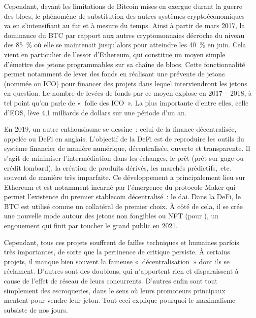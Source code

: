 
Cependant, devant les limitations de Bitcoin mises en exergue durant la guerre des blocs, le phénomène de substitution des autres systèmes cryptoéconomiques va en s'intensifiant au fur et à mesure du temps. Ainsi à partir de mars 2017, la dominance du BTC par rapport aux autres cryptomonnaies décroche du niveau des 85~\% où elle se maintenait jusqu'alors pour atteindre les 40~\% en juin. Cela vient en particulier de l'essor d'Ethereum, qui constitue un moyen simple d'émettre des jetons programmables sur sa chaîne de blocs. Cette fonctionnalité permet notamment de lever des fonds en réalisant une prévente de jetons (nommée  ou ICO) pour financer des projets dans lequel interviendront les jetons en question. Le nombre de levées de fonds par ce moyen explose en 2017 -- 2018, à tel point qu'on parle de «~folie des ICO~». La plus importante d'entre elles, celle d'EOS, lève 4,1 milliards de dollars sur une période d'un an.


En 2019, un autre enthousiasme se dessine~: celui de la finance décentralisée, appelée  ou DeFi en anglais. L'objectif de la DeFi est de reproduire les outils du système financier de manière numérique, décentralisée, ouverte et transparente. Il s'agit de minimiser l'intermédiation dans les échanges, le prêt (prêt sur gage ou crédit lombard), la création de produits dérivés, les marchés prédictifs,~etc. souvent de manière très imparfaite. Ce développement a principalement lieu sur Ethereum et est notamment incarné par l'émergence du protocole Maker qui permet l'existence du premier stablecoin décentralisé~: le dai. Dans la DeFi, le BTC est utilisé comme un collatéral de premier choix. À côté de cela, il se crée une nouvelle mode autour des jetons non fongibles ou NFT (pour ), un engouement qui finit par toucher le grand public en 2021.

Cependant, tous ces projets souffrent de failles techniques et humaines parfois très importantes, de sorte que la pertinence de critique persiste. À certains projets, il manque bien souvent la fameuse «~décentralisation~» dont ils se réclament. D'autres sont des doublons, qui n'apportent rien et disparaissent à cause de l'effet de réseau de leurs concurrents. D'autres enfin sont tout simplement des escroqueries, dans le sens où leurs promoteurs principaux mentent pour vendre leur jeton. Tout ceci explique pourquoi le maximalisme subsiste de nos jours.

